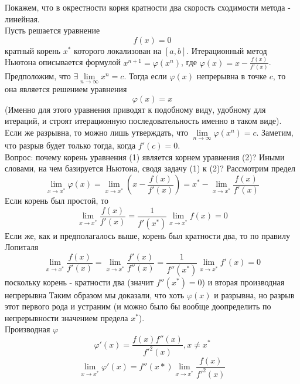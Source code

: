 \documentclass[12pt,a4paper]{article}
\begin{document}
	\begin{description}[font=$\bullet$~\normalfont\scshape\color{red!50!black}]
		\item[Метод Ньютона.Кратные корни.] Покажем, что в окрестности корня кратности два скорость сходимости метода - линейная. \\
		Пусть решается уравнение \begin{equation}
			f(x) = 0
		\end{equation} кратный корень $x^{*}$ которого локализован на $[a,b]$.
		Итерационный метод Ньютона описывается формулой $x^{n+1} = \varphi(x^n)$, где $\varphi(x) = x - \frac{f(x)}{f'(x)} $. \\
		Предположим, что $\exists \lim\limits_{n\to\infty}x^n = c$. Тогда если $\varphi(x)$ непрерывна в точке $c$, то  она является решением уравнения \begin{equation}
			\varphi(x) = x
		\end{equation}
		 (Именно для этого уравнения приводят к подобному виду, удобному для итераций, и строят итерационную последовательность именно в таком виде). Если же разрывна, то можно лишь утверждать, что $\lim\limits_{n\to\infty}\varphi(x^n) = c$. Заметим, что разрыв будет только тогда, когда $f'(c) = 0$. \\
		 Вопрос: почему корень уравнения (1) является корнем уравнения (2)? Иными словами, на чем базируется Ньютона, сводя задачу (1) к (2)?
		 Рассмотрим предел
		\begin{equation}
					 	\lim\limits_{x\to x^*}\varphi(x) = \lim\limits_{x\to x^*}(x - \frac{f(x)}{f'(x)}) = x^* - \lim\limits_{x\to x^*}\frac{f(x)}{f'(x)}
		\end{equation}
		 Если корень был простой, то 
		 $$
		  \lim\limits_{x\to x^*}\frac{f(x)}{f'(x)} = \frac{1}{f'(x^*)} \lim\limits_{x\to x^*}f(x) = 0
		  $$
		  Если же, как и предполагалось выше, корень был кратности два, то по правилу Лопиталя
		  $$
		  	\lim\limits_{x\to x^*}\frac{f(x)}{f'(x)} = \lim\limits_{x\to x^*}\frac{f'(x)}{f''(x)} = \frac{1}{f''(x^*)} \lim\limits_{x\to x^*}f'(x) = 0
		  $$
		  поскольку корень - кратности два (значит $f''(x^*) = 0$) и вторая производная непрерывна
		  Таким образом мы доказали, что хоть $\varphi(x)$ и разрывна, но разрыв этот первого рода и устраним (и можно было бы вообще доопределить по непрерывности значением предела  $x^*$). \\
		 Производная $\varphi$
		  $$
		  	\varphi'(x) = \frac{f(x) f''(x)}{f'^2(x)}, x \neq x^*
		  $$
		\begin{equation}
			\lim\limits_{x\to x^*}\varphi'(x) = f''(x*) \lim\limits_{x\to x^*}\frac{f(x)}{f'^2(x)} 

\end{equation}
\end{description}
\end{document}
